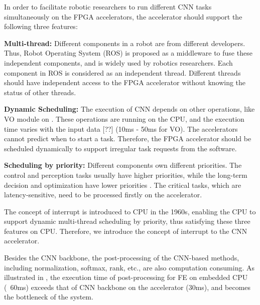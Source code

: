 In order to facilitate robotic researchers to run different CNN tasks simultaneously on the FPGA accelerators, the accelerator should support the following three features:

\textbf{Multi-thread:} Different components in a robot are from different developers. Thus, Robot Operating System (ROS) \cite{quigley2009ros} is proposed as a middleware to fuse these independent components, and is widely used by robotics researchers. Each component in ROS is considered as an independent thread. Different threads should have independent access to the FPGA accelerator without knowing the status of other threads.



\textbf{Dynamic Scheduling:} The execution of CNN depends on other operations, like VO module on . 
These operations are running on the CPU, and the execution time varies with the input data [??] (10ms - 50ms for VO). 
The accelerators cannot predict when to start a task. 
Therefore, the FPGA accelerator should be scheduled dynamically to support irregular task requests from the software.

\textbf{Scheduling by priority:} Different components own different priorities. The control and perception tasks usually have higher priorities, while the long-term decision and optimization have lower priorities \cite{RamsauerKLM17}. The critical tasks, which are latency-sensitive,  need to be processed firstly on the accelerator.

The concept of interrupt \cite{jen1974processor} is introduced to CPU in the 1960s, enabling the CPU to support dynamic multi-thread scheduling by priority, thus satisfying these three features on CPU. Therefore, we introduce the concept of interrupt to the CNN accelerator.

Besides the CNN backbone, the post-processing of the CNN-based methods, including normalization, softmax, rank, etc., are also computation consuming. As illustrated in , the execution time of post-processing for FE on embedded CPU (~60ms) exceeds that of CNN backbone on the accelerator (30ms), and becomes the bottleneck of the system.

